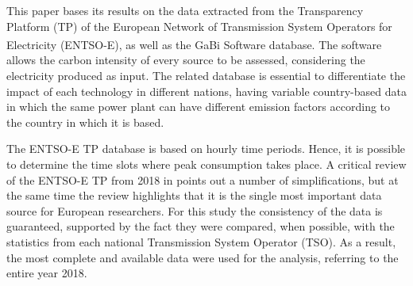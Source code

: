 This paper bases its results on the data extracted from the Transparency Platform (TP) of the European Network of Transmission System Operators for Electricity (ENTSO-E), as well as the GaBi\textsuperscript{\textregistered} Software database. {The software allows the carbon intensity of every source to be assessed, considering the electricity produced as input. The related database is essential to differentiate the impact of each technology in different nations, having variable country-based data in which the same power plant can have different emission factors according to the country in which it is based}.
 
The ENTSO-E TP database is based on hourly time periods. Hence, it is possible to determine the time slots where peak consumption takes place. A critical review of the ENTSO-E TP from 2018 in \cite{Hirth2018ThePlatform} points out a number of simplifications, but at the same time the review highlights that it is the single most important data source for European researchers. For this study the consistency of the data is guaranteed, supported by the fact they were compared, when possible, with the statistics from each national Transmission System Operator (TSO). As a result, the most complete and available data were used for the analysis, referring to the entire year 2018.  %





